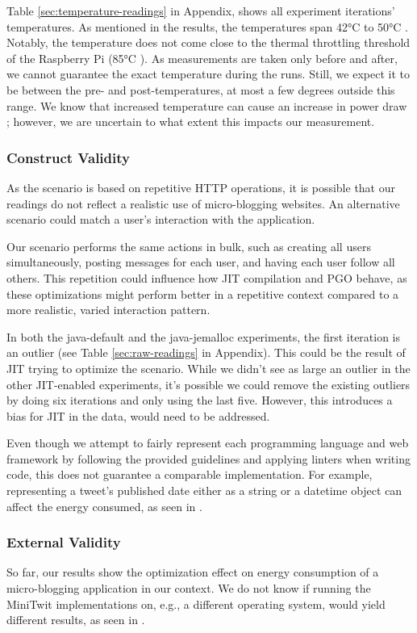 \documentclass[main.tex]{subfiles}
\begin{document}
Table \ref{sec:temperature-readings} in Appendix, shows all experiment iterations' temperatures. As mentioned in the results, the temperatures span 42°C  to 50°C . Notably, the temperature does not come close to the thermal throttling threshold  of the Raspberry Pi (85°C \cite{raspberry-pi-thermal-throttling-github}). As measurements are taken only before and after, we cannot guarantee the exact temperature during the runs. Still, we expect it to be between the pre- and post-temperatures, at most a few degrees outside this range. We know that increased temperature can cause an increase in power draw \cite{ling2016university}; however, we are uncertain to what extent this impacts our measurement.

\subsubsection{Construct Validity}
As the scenario is based on repetitive HTTP operations, it is possible that our readings do not reflect a realistic use of micro-blogging websites. An alternative scenario could match a user's interaction with the application.

Our scenario performs the same actions in bulk, such as creating all users simultaneously, posting messages for each user, and having each user follow all others. This repetition could influence how JIT compilation and PGO behave, as these optimizations might perform better in a repetitive context compared to a more realistic, varied interaction pattern.

In both the java-default and the java-jemalloc experiments, the first iteration is an outlier (see Table \ref{sec:raw-readings} in Appendix). This could be the result of JIT trying to optimize the scenario. While we didn't see as large an outlier in the other JIT-enabled experiments, it's possible we could remove the existing outliers by doing six iterations and only using the last five. However, this introduces a bias for JIT in the data, would need to be addressed. 

Even though we attempt to fairly represent each programming language and web framework by following the provided guidelines and applying linters when writing code, this does not guarantee a comparable implementation. For example, representing a tweet's published date either as a string or a datetime object can affect the energy consumed, as seen in \textcite{Dutta_Vandermeer_2023}.

\subsubsection{External Validity}
So far, our results show the optimization effect on energy consumption of a micro-blogging application in our context. We do not know if running the MiniTwit implementations on, e.g., a different operating system, would yield different results, as seen in \textcite{Roque_Cruz_Durieux_2024}.
\end{document}
